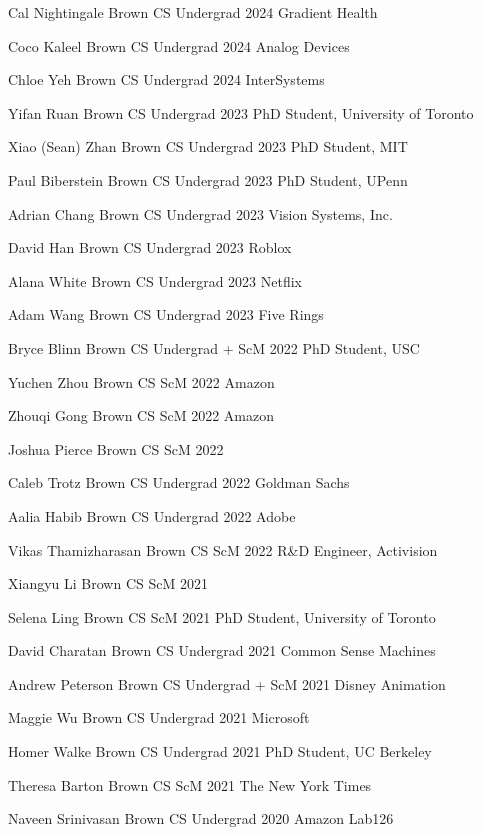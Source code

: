 \documentclass[line,margin]{res}
\begin{document}
\begin{resume}
\alumni
{Cal Nightingale}
{Brown CS Undergrad}
{2024}
{Gradient Health}

\alumni
{Coco Kaleel}
{Brown CS Undergrad}
{2024}
{Analog Devices}

\alumni
{Chloe Yeh}
{Brown CS Undergrad}
{2024}
{InterSystems}

\alumni
{Yifan Ruan}
{Brown CS Undergrad}
{2023}
{PhD Student, University of Toronto}

\alumni
{Xiao (Sean) Zhan}
{Brown CS Undergrad}
{2023}
{PhD Student, MIT}

\alumni
{Paul Biberstein}
{Brown CS Undergrad}
{2023}
{PhD Student, UPenn}

\alumni
{Adrian Chang}
{Brown CS Undergrad}
{2023}
{Vision Systems, Inc.}

\alumni
{David Han}
{Brown CS Undergrad}
{2023}
{Roblox}

\alumni
{Alana White}
{Brown CS Undergrad}
{2023}
{Netflix}

\alumni
{Adam Wang}
{Brown CS Undergrad}
{2023}
{Five Rings}

\alumni
{Bryce Blinn}
{Brown CS Undergrad + ScM}
{2022}	
{PhD Student, USC}

\alumni
{Yuchen Zhou}
{Brown CS ScM}
{2022}
{Amazon}

\alumni
{Zhouqi Gong}
{Brown CS ScM}
{2022}
{Amazon}

\alumni
{Joshua Pierce}
{Brown CS ScM}
{2022}
{}

\alumni
{Caleb Trotz}
{Brown CS Undergrad}
{2022}
{Goldman Sachs}

\alumni
{Aalia Habib}
{Brown CS Undergrad}
{2022}
{Adobe}

\alumni
{Vikas Thamizharasan}
{Brown CS ScM}
{2022}
{R\&D Engineer, Activision}

\alumni
{Xiangyu Li}
{Brown CS ScM}
{2021}
{}

\alumni
{Selena Ling}
{Brown CS ScM}
{2021}
{PhD Student, University of Toronto}

\alumni
{David Charatan}
{Brown CS Undergrad}
{2021}
{Common Sense Machines}

\alumni
{Andrew Peterson}
{Brown CS Undergrad + ScM}
{2021}
{Disney Animation}

\alumni
{Maggie Wu}
{Brown CS Undergrad}
{2021}
{Microsoft}

\alumni
{Homer Walke}
{Brown CS Undergrad}
{2021}
{PhD Student, UC Berkeley}

\alumni
{Theresa Barton}
{Brown CS ScM}
{2021}
{The New York Times}

\alumni
{Naveen Srinivasan}
{Brown CS Undergrad}
{2020}
{Amazon Lab126}


\end{resume}
\end{document}

